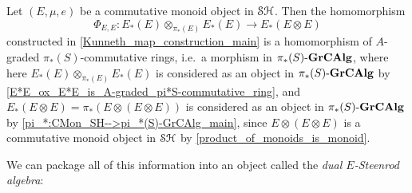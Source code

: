 \documentclass[../main.tex]{subfiles}
\begin{document}
\begin{lemma}\label{Phi_E_is_homo_of_A-graded_pi_*S-commutative_rings_main}
    Let $(E,\mu,e)$ be a commutative monoid object in $\mathcal{SH}$. Then the homomorphism
    \[\Phi_{E,E}:E_*(E)\otimes_{\pi_*(E)}E_*(E)\to E_*(E\otimes E)\]
    constructed in \autoref{Kunneth_map_construction_main} is a homomorphism of $A$-graded $\pi_*(S)$-commutative rings, i.e.\ a morphism in ${\pi_*(S)}\text-\mathbf{GrCAlg}$, where here $E_*(E)\otimes_{\pi_*(E)}E_*(E)$ is considered as an object in ${\pi_*(S)}\text-\mathbf{GrCAlg}$ by \autoref{E*E_ox_E*E_is_A-graded_pi*S-commutative_ring}, and $E_*(E\otimes E)=\pi_*(E\otimes (E\otimes E))$ is considered as an object in ${\pi_*(S)}\text-\mathbf{GrCAlg}$ by \autoref{pi_*:CMon_SH-->pi_*(S)-GrCAlg_main}, since $E\otimes(E\otimes E)$ is a commutative monoid object in $\mathcal{SH}$ by \autoref{product_of_monoids_is_monoid}.
\end{lemma}

We can package all of this information into an object called the \emph{dual $E$-Steenrod algebra}:
\end{document}
